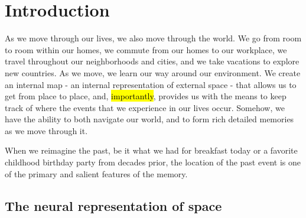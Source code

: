 \chapter{Introduction}



%
%
%
%
%
%
%



As we move through our lives, we also move through the world. We go from room to room within our homes, we commute from our homes to our workplace, we travel throughout our neighborhoods and cities, and we take vacations to explore new countries. As we move, we learn our way around our environment. We create an internal map - an internal representation of external space - that allows us to get from place to place, and, \hl{importantly}, provides us with the means to keep track of where the events that we experience in our lives occur. Somehow, we have the ability to both navigate our world, and to form rich detailed memories as we move through it.

When we reimagine the past, be it what we had for breakfast today or a favorite childhood birthday party from decades prior, the location of the past event is one of the primary and salient features of the memory. 





%
%
%
%
%
%
%
%
%
%
%




\section{The neural representation of space}

